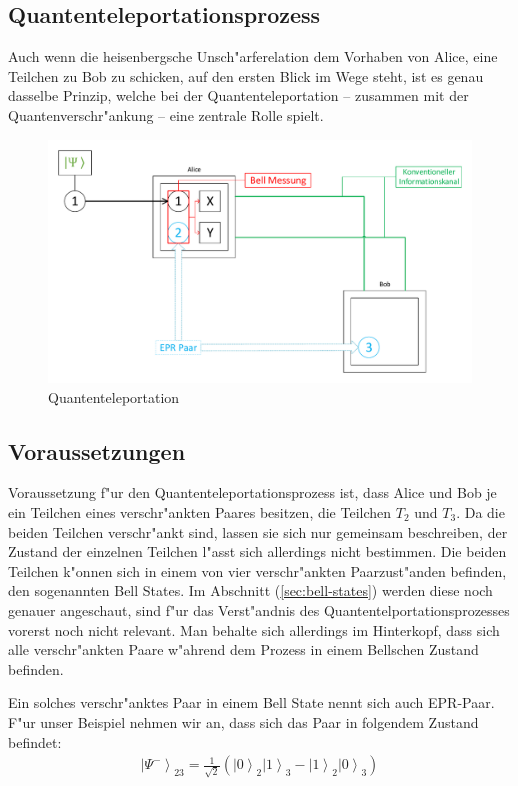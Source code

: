 \begin{refsection}
\section{Quantenteleportationsprozess}
Auch wenn die heisenbergsche Unsch"arferelation dem Vorhaben von Alice, eine Teilchen zu Bob zu schicken, auf den ersten Blick im Wege steht, ist es genau dasselbe Prinzip, welche bei der Quantenteleportation – zusammen mit der Quantenverschr"ankung – eine zentrale Rolle spielt.
\begin{figure}
	\center
	\includegraphics[width=1\textwidth]{teleport/image/quantum_com.pdf}
	\caption{Quantenteleportation}
	\label{Quantenteleportation}
\end{figure}

\subsection{Voraussetzungen}
Voraussetzung f"ur den Quantenteleportationsprozess ist, dass Alice und Bob je ein Teilchen eines verschr"ankten Paares besitzen, die Teilchen $T_{2}$ und $T_{3}$. Da die beiden Teilchen  verschr"ankt sind, lassen sie sich nur gemeinsam beschreiben, der Zustand der einzelnen Teilchen l"asst sich allerdings nicht bestimmen. Die beiden Teilchen k"onnen sich in einem von vier verschr"ankten Paarzust"anden befinden, den sogenannten Bell States. Im Abschnitt (\ref{sec:bell-states}) werden diese noch genauer angeschaut, sind f"ur das Verst"andnis des Quantentelportationsprozesses vorerst noch nicht relevant. Man behalte sich allerdings im Hinterkopf, dass sich alle verschr"ankten Paare w"ahrend dem Prozess in einem Bellschen Zustand befinden.

Ein solches verschr"anktes Paar in einem Bell State nennt sich auch EPR-Paar. F"ur unser Beispiel nehmen wir an, dass sich das Paar in folgendem Zustand befindet:
\begin{align}\label{eq:bell_state1}
\left|\Psi^{-}\right\rangle_{23} = \frac{1}{\sqrt{2}} ( \left|0\right\rangle_{2}\left|1\right\rangle_{3} - \left|1\right\rangle_{2}\left|0\right\rangle_{3} )
\end{align}


\end{refsection}
